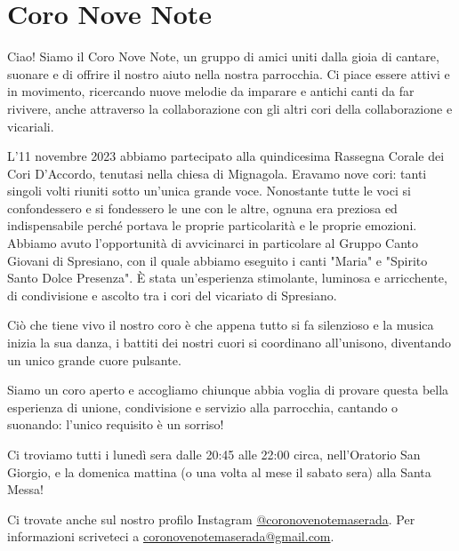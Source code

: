 \section{Coro Nove Note}

Ciao! Siamo il Coro Nove Note, un gruppo di amici uniti dalla gioia di cantare, suonare e di offrire il nostro aiuto nella nostra parrocchia. Ci piace essere attivi e in movimento, ricercando nuove melodie da imparare e antichi canti da far rivivere, anche attraverso la collaborazione con gli altri cori della collaborazione e vicariali.

L'11 novembre 2023 abbiamo partecipato alla quindicesima Rassegna Corale dei Cori D'Accordo, tenutasi nella chiesa di Mignagola. Eravamo nove cori: tanti singoli volti riuniti sotto un'unica grande voce. Nonostante tutte le voci si confondessero e si fondessero le une con le altre, ognuna era preziosa ed indispensabile perché portava le proprie particolarità e le proprie emozioni. Abbiamo avuto l'opportunità di avvicinarci in particolare al Gruppo Canto Giovani di Spresiano, con il quale abbiamo eseguito i canti "Maria" e "Spirito Santo Dolce Presenza".
È stata un'esperienza stimolante, luminosa e arricchente, di condivisione e ascolto tra i cori del vicariato di Spresiano. 

Ciò che tiene vivo il nostro coro è che appena tutto si fa silenzioso e la musica inizia la sua danza, i battiti dei nostri cuori si coordinano all'unisono, diventando un unico grande cuore pulsante.

Siamo un coro aperto e accogliamo chiunque abbia voglia di provare questa bella esperienza di unione, condivisione e servizio alla parrocchia, cantando o suonando: l'unico requisito è un sorriso!

Ci troviamo tutti i lunedì sera dalle 20:45 alle 22:00 circa, nell'Oratorio San Giorgio, e la domenica mattina (o una volta al mese il sabato sera) alla Santa Messa!

Ci trovate anche sul nostro profilo Instagram \url{@coronovenotemaserada}. Per informazioni scriveteci a \url{coronovenotemaserada@gmail.com}.


